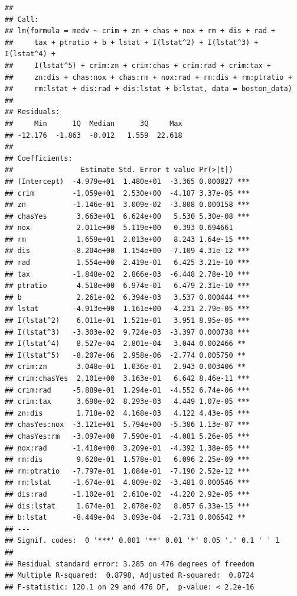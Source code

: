 \documentclass[
]{article}
\begin{document}
\begin{verbatim}
## 
## Call:
## lm(formula = medv ~ crim + zn + chas + nox + rm + dis + rad + 
##     tax + ptratio + b + lstat + I(lstat^2) + I(lstat^3) + I(lstat^4) + 
##     I(lstat^5) + crim:zn + crim:chas + crim:rad + crim:tax + 
##     zn:dis + chas:nox + chas:rm + nox:rad + rm:dis + rm:ptratio + 
##     rm:lstat + dis:rad + dis:lstat + b:lstat, data = boston_data)
## 
## Residuals:
##     Min      1Q  Median      3Q     Max 
## -12.176  -1.863  -0.012   1.559  22.618 
## 
## Coefficients:
##                Estimate Std. Error t value Pr(>|t|)    
## (Intercept)  -4.979e+01  1.480e+01  -3.365 0.000827 ***
## crim         -1.059e+01  2.530e+00  -4.187 3.37e-05 ***
## zn           -1.146e-01  3.009e-02  -3.808 0.000158 ***
## chasYes       3.663e+01  6.624e+00   5.530 5.30e-08 ***
## nox           2.011e+00  5.119e+00   0.393 0.694661    
## rm            1.659e+01  2.013e+00   8.243 1.64e-15 ***
## dis          -8.204e+00  1.154e+00  -7.109 4.31e-12 ***
## rad           1.554e+00  2.419e-01   6.425 3.21e-10 ***
## tax          -1.848e-02  2.866e-03  -6.448 2.78e-10 ***
## ptratio       4.518e+00  6.974e-01   6.479 2.31e-10 ***
## b             2.261e-02  6.394e-03   3.537 0.000444 ***
## lstat        -4.913e+00  1.161e+00  -4.231 2.79e-05 ***
## I(lstat^2)    6.011e-01  1.521e-01   3.951 8.95e-05 ***
## I(lstat^3)   -3.303e-02  9.724e-03  -3.397 0.000738 ***
## I(lstat^4)    8.527e-04  2.801e-04   3.044 0.002466 ** 
## I(lstat^5)   -8.207e-06  2.958e-06  -2.774 0.005750 ** 
## crim:zn       3.048e-01  1.036e-01   2.943 0.003406 ** 
## crim:chasYes  2.101e+00  3.163e-01   6.642 8.46e-11 ***
## crim:rad     -5.889e-01  1.294e-01  -4.552 6.74e-06 ***
## crim:tax      3.690e-02  8.293e-03   4.449 1.07e-05 ***
## zn:dis        1.718e-02  4.168e-03   4.122 4.43e-05 ***
## chasYes:nox  -3.121e+01  5.794e+00  -5.386 1.13e-07 ***
## chasYes:rm   -3.097e+00  7.590e-01  -4.081 5.26e-05 ***
## nox:rad      -1.410e+00  3.209e-01  -4.392 1.38e-05 ***
## rm:dis        9.620e-01  1.578e-01   6.096 2.25e-09 ***
## rm:ptratio   -7.797e-01  1.084e-01  -7.190 2.52e-12 ***
## rm:lstat     -1.674e-01  4.809e-02  -3.481 0.000546 ***
## dis:rad      -1.102e-01  2.610e-02  -4.220 2.92e-05 ***
## dis:lstat     1.674e-01  2.078e-02   8.057 6.33e-15 ***
## b:lstat      -8.449e-04  3.093e-04  -2.731 0.006542 ** 
## ---
## Signif. codes:  0 '***' 0.001 '**' 0.01 '*' 0.05 '.' 0.1 ' ' 1
## 
## Residual standard error: 3.285 on 476 degrees of freedom
## Multiple R-squared:  0.8798, Adjusted R-squared:  0.8724 
## F-statistic: 120.1 on 29 and 476 DF,  p-value: < 2.2e-16
\end{verbatim}
\end{document}
